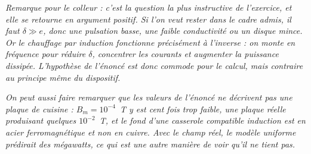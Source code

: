 \begin{correction}
\begin{enumerate}
	\textit{Remarque pour le colleur : c'est la question la plus instructive de l'exercice, et elle se retourne en argument positif. Si l'on veut rester dans le cadre admis, il faut $\delta\gg e$, donc une pulsation basse, une faible conductivité ou un disque mince. Or le chauffage par induction fonctionne précisément à l'inverse : on monte en fréquence pour réduire $\delta$, concentrer les courants et augmenter la puissance dissipée. L'hypothèse de l'énoncé est donc commode pour le calcul, mais contraire au principe même du dispositif.}

	\textit{On peut aussi faire remarquer que les valeurs de l'énoncé ne décrivent pas une plaque de cuisine : $B_m=10^{-4}$~T y est cent fois trop faible, une plaque réelle produisant quelques $10^{-2}$~T, et le fond d'une casserole compatible induction est en acier ferromagnétique et non en cuivre. Avec le champ réel, le modèle uniforme prédirait des mégawatts, ce qui est une autre manière de voir qu'il ne tient pas.}

\end{enumerate}

\end{correction}

